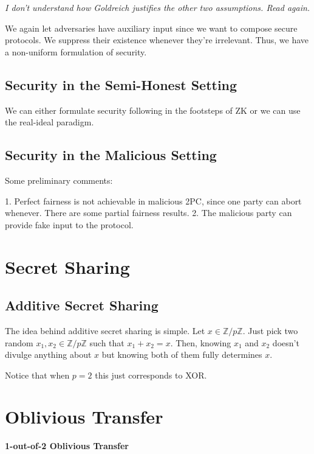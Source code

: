 \documentclass{article}
\theoremstyle{definition}
\begin{document}
\textit{I don't understand how Goldreich justifies the other two assumptions. Read again.}

We again let adversaries have auxiliary input since we want to compose secure protocols.
We suppress their existence whenever they're irrelevant. Thus, we have a non-uniform
formulation of security.

\subsection{Security in the Semi-Honest Setting}

We can either formulate security following in the footsteps of ZK or we can use the real-ideal paradigm.

\subsection{Security in the Malicious Setting}

Some preliminary comments:

1. Perfect fairness is not achievable in malicious 2PC, since one party can abort whenever. There are some partial fairness results.
2. The malicious party can provide fake input to the protocol.



\newpage

\section{Secret Sharing}

\subsection{Additive Secret Sharing}

The idea behind additive secret sharing is simple. Let $x \in \mathbb{Z}/p\mathbb{Z}$. Just pick two random $x_{1},x_{2} \in \mathbb{Z}/p\mathbb{Z}$ such that $x_{1} + x_{2} = x$. Then, knowing $x_{1}$ and $x_{2}$ doesn't divulge anything about $x$ but knowing both of them fully determines $x$.

Notice that when $p = 2$ this just corresponds to XOR.

\newpage

\section{Oblivious Transfer}

\textbf{1-out-of-2 Oblivious Transfer}
\end{document}
